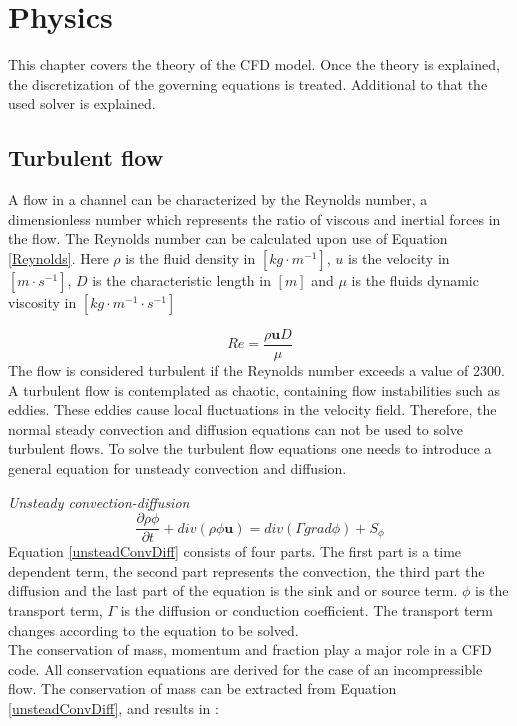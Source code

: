 \documentclass{CFD2017}
\begin{document}
\section{Physics}
This chapter covers the theory of the CFD model. Once the theory is explained, the discretization of the governing equations is treated. Additional to that the used solver is explained.

\subsection{Turbulent flow}
A flow in a channel can be characterized by the Reynolds number, a dimensionless number which represents the ratio of viscous and inertial forces in the flow. The Reynolds number can be calculated upon use of Equation \ref{Reynolds}\cite{Versteeg2007}. Here $\rho$ is the fluid density in $[kg\cdot m^{-1}]$, $u$ is the velocity in $[m\cdot s^{-1}]$, $D$ is the characteristic length in $[m]$ and $\mu$ is the fluids dynamic viscosity in $[kg\cdot m^{-1}\cdot s^{-1}]$

\begin{equation}
\label{Reynolds}
Re = \frac{\rho \boldsymbol{u} D}{\mu}
\end{equation}
The flow is considered turbulent if the Reynolds number exceeds a value of 2300. A turbulent flow is contemplated as chaotic, containing flow instabilities such as eddies. These eddies cause local fluctuations in the velocity field. Therefore, the normal steady convection and diffusion equations can not be used to solve turbulent flows. To solve the turbulent flow equations one needs to introduce a general equation for unsteady convection and diffusion\cite{Versteeg2007}.\vspace{2mm}

\emph{Unsteady convection-diffusion}
\begin{equation}
\label{unsteadConvDiff}
\frac{\partial \rho \phi}{\partial t} + div(\rho\phi\mathbf u)= div(\Gamma grad \phi)+S_{\phi}
\end{equation}
Equation \ref{unsteadConvDiff} consists of four parts. The first part is a time dependent term, the second part represents the convection, the third part the diffusion and the last part of the equation is the sink and or source term. $\phi$ is the transport term, $\Gamma$ is the diffusion or conduction coefficient. The transport term changes according to the equation to be solved. \\
The conservation of mass, momentum and fraction play a major role in a CFD code. All conservation equations are derived for the case of an incompressible flow. The conservation of mass can be extracted from Equation \ref{unsteadConvDiff}, and results in \cite{slides}:\vspace{2mm}
\end{document}

